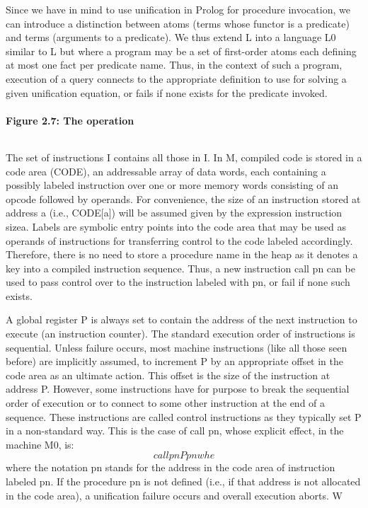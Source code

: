 
Since we have in mind to use unification in Prolog for procedure invocation, we
can introduce a distinction between atoms (terms whose functor is a predicate)
and terms (arguments to a predicate). We thus extend L into a language L0
similar to L but where a program may be a set of first-order atoms each defining
at most one fact per predicate name. Thus, in the context of such a program,
execution of a query connects to the appropriate definition to use for solving a
given unification equation, or fails if none exists for the predicate invoked.

\paragraph{Figure 2.7: The  operation}
\begin{verbatim}

\end{verbatim}

The set of instructions I contains all those in I.
In M, compiled code is stored in a code area (CODE), an addressable array of
data words, each containing a possibly labeled instruction over one or more
memory words consisting of an opcode followed by operands. For convenience, the
size of an instruction stored at address a (i.e., CODE[a]) will be assumed given
by the expression instruction sizea.
Labels are symbolic entry points into the code area that may be used as operands
of instructions for transferring control to the code labeled accordingly.
Therefore, there is no need to store a procedure name in the heap as it denotes
a key into a compiled instruction sequence. Thus, a new instruction call pn can
be used to pass control over to the instruction labeled with pn, or fail if none
such exists.

A global register P is always set to contain the address of the next instruction to
execute (an instruction counter). The standard execution order of instructions is
sequential. Unless failure occurs, most machine instructions (like all those seen
before) are implicitly assumed, to increment P by an appropriate offset in the
code area as an ultimate action. This offset is the size of the instruction at address
P. However, some instructions have for purpose to break the sequential order of
execution or to connect to some other instruction at the end of a sequence. These
instructions are called control instructions as they typically set P in a non-standard
way. This is the case of call pn, whose explicit effect, in the machine M0, is:
\[call pn  P  pnwhe\]
where the notation pn stands for the address in the code area of instruction
labeled pn. If the procedure pn is not defined (i.e., if that address is not
allocated in the code area), a unification failure occurs and overall execution
aborts. W

